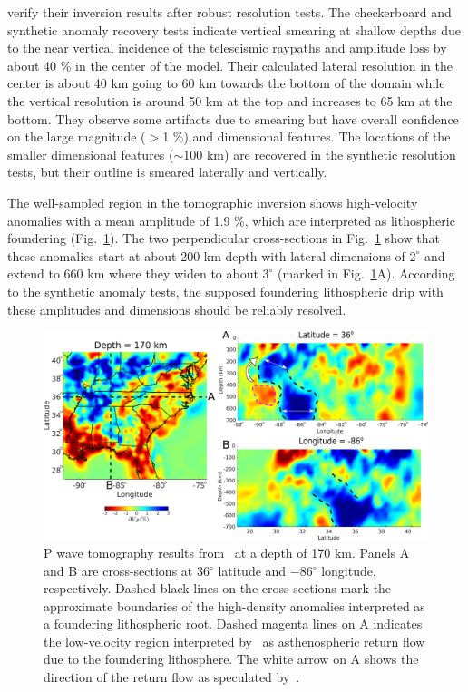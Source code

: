 \documentclass[draft,linenumbers]{agujournal2018}
\begin{document}
    \citet{Biryol_2016} verify their inversion results after robust resolution tests. The checkerboard and synthetic anomaly recovery tests indicate vertical smearing at shallow depths due to the near vertical incidence of the teleseismic raypaths and amplitude loss by about 40 \% in the center of the model. Their calculated lateral resolution in the center is about 40 km going to 60 km towards the bottom of the domain while the vertical resolution  is around 50 km at the top and increases to 65 km at the bottom. They observe some artifacts due to smearing but have overall confidence on the large magnitude ($>$1 \%) and dimensional features. The locations of the smaller dimensional features ($\sim$100 km) are recovered in the synthetic resolution tests, but their outline is smeared laterally and vertically. 
    
    The well-sampled region in the tomographic inversion shows
    high-velocity anomalies with a mean amplitude of 1.9 \%, which are interpreted as lithospheric foundering (Fig.~\ref{fig_tomo}). The two perpendicular cross-sections in Fig.~\ref{fig_tomo} show that these anomalies start at about 200 km depth with lateral dimensions of $2^\circ$ and extend to 660 km where they widen to about $3^\circ$ (marked in Fig.~\ref{fig_tomo}A). According to the synthetic anomaly tests, the supposed foundering lithospheric drip with these amplitudes and dimensions should be reliably resolved.
%
\begin{figure}[ht]
    \centering
    \includegraphics[width=\linewidth]{figures/figure_tomography.png}
    \caption{P wave tomography results from~\citep{Biryol_2016} at a depth of 170 km. Panels A and B are cross-sections at 36$^\circ$ latitude and $-$86$^{\circ}$ longitude, respectively. Dashed black lines on the cross-sections mark the approximate boundaries of the high-density anomalies interpreted as a foundering lithospheric root. Dashed magenta lines on A indicates the low-velocity region interpreted by~\citet{Biryol_2016} as asthenospheric return flow due to the foundering lithosphere. The white arrow on A shows the direction of the return flow as speculated by~\citet{Biryol_2016}.}
    \label{fig_tomo}
 \end{figure}
\end{document}
